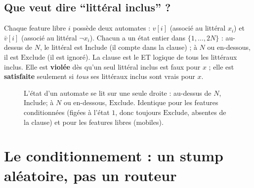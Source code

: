 \documentclass[12pt,a4paper]{article}
\newcommand{\Inc}{\ensuremath{\mathrm{Include}}}
\newcommand{\Exc}{\ensuremath{\mathrm{Exclude}}}
\newcommand{\vbar}{\bar{v}}
\theoremstyle{remark}
\begin{document}
\subsection{Que veut dire ``littéral inclus'' ?}

Chaque feature libre $i$ possède deux automates : $v[i]$ (associé au littéral
$x_i$) et $\vbar[i]$ (associé au littéral $\neg x_i$). Chacun a un état entier
dans $\{1,\dots,2N\}$ : au-dessus de $N$, le littéral est \Inc{} (il compte
dans la clause) ; à $N$ ou en-dessous, il est \Exc{} (il est ignoré). La
clause est le ET logique de tous les littéraux inclus. Elle est
\textbf{violée} dès qu'un seul littéral inclus est faux pour $x$ ; elle est
\textbf{satisfaite} seulement si \emph{tous} ses littéraux inclus sont vrais
pour $x$.

\begin{figure}[h]
\centering
{}
\caption{L'état d'un automate se lit sur une seule droite : au-dessus de $N$,
\Inc ; à $N$ ou en-dessous, \Exc. Identique pour les features conditionnées
(figées à l'état $1$, donc toujours \Exc, absentes de la clause) et pour les
features libres (mobiles).}
\label{fig:automate-line}
\end{figure}

\section{Le conditionnement : un stump aléatoire, pas un routeur}\label{sec:cond}
\end{document}
